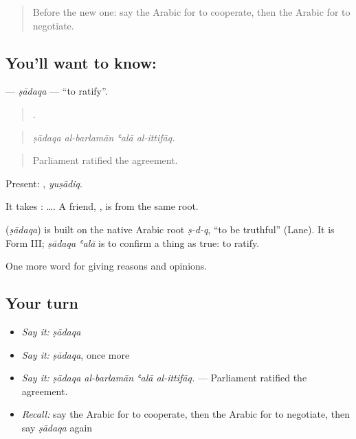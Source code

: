 \label{lesson:AR-C386-sadaqa}



\begin{quote}
Before the new one: say the Arabic for to cooperate, then the Arabic for to negotiate.
\end{quote}

\subsection*{You'll want to know: }
\textbf{} — \emph{ṣādaqa} — \textquotedblleft{}to ratify\textquotedblright{}.

\begin{quote}
   .
\end{quote}

\begin{quote}
\emph{ṣādaqa al-barlamān ʿalā al-ittifāq.}
\end{quote}

\begin{quote}
Parliament ratified the agreement.
\end{quote}

Present: , \emph{yuṣādiq}.

It takes :   …. A friend, , is from the same root.

\begin{cousinweb}
\textbf{} (\emph{ṣādaqa}) is built on the native Arabic root \emph{ṣ-d-q}, \textquotedblleft{}to be truthful\textquotedblright{} (Lane). It is Form III; \emph{ṣādaqa ʿalā} is to confirm a thing as true: to ratify.
\end{cousinweb}

\begin{grammarlens}[title={What you've built}]
One more word for giving reasons and opinions.
\end{grammarlens}

\subsection*{Your turn}
\begin{itemize}
\raggedright
  \item \emph{Say it:} \emph{ṣādaqa}
  \item \emph{Say it:} \emph{ṣādaqa}, once more
  \item \emph{Say it:} \emph{ṣādaqa al-barlamān ʿalā al-ittifāq.} — Parliament ratified the agreement.
  \item \emph{Recall:} say the Arabic for to cooperate, then the Arabic for to negotiate, then say \emph{ṣādaqa} again
\end{itemize}

